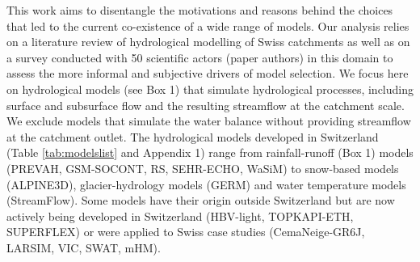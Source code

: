 \documentclass[10pt,a4paper]{article}
\begin{document}
This work aims to disentangle the motivations and reasons behind the choices that led to the current co-existence of a wide range of models. Our analysis relies on a literature review of hydrological modelling of Swiss catchments as well as on a survey conducted with 50 scientific actors (paper authors) in this domain to assess the more informal and subjective drivers of model selection. We focus here on hydrological models (see Box 1) that simulate hydrological processes, including surface and subsurface flow and the resulting streamflow at the catchment scale. We exclude models that simulate the water balance without providing streamflow at the catchment outlet. The hydrological models developed in Switzerland (Table \ref{tab:modelslist} and Appendix 1) range from rainfall-runoff (Box 1) models (PREVAH, GSM-SOCONT, RS, SEHR-ECHO, WaSiM) to snow-based models (ALPINE3D), glacier-hydrology models (GERM) and water temperature models (StreamFlow). Some models have their origin outside Switzerland but are now actively being developed in Switzerland (HBV-light, TOPKAPI-ETH, SUPERFLEX) or were applied to Swiss case studies (CemaNeige-GR6J, LARSIM, VIC, SWAT, mHM).
\end{document}
